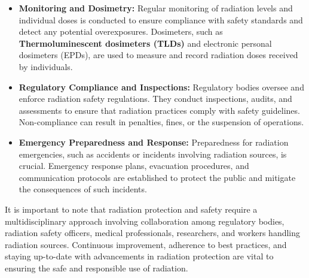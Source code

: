 \documentclass[../../Report.tex]{subfiles}
\begin{document}
\begin{itemize}
            \item \textbf{Monitoring and Dosimetry:} Regular monitoring of radiation levels and individual doses is conducted to ensure 
            compliance with safety standards and detect any potential overexposures. Dosimeters, such as \textbf{Thermoluminescent dosimeters (TLDs)} 
            and electronic personal dosimeters (EPDs), are used to measure and record radiation doses received by individuals.

            \item \textbf{Regulatory Compliance and Inspections:} Regulatory bodies oversee and enforce radiation safety regulations. 
            They conduct inspections, audits, and assessments to ensure that radiation practices comply with safety guidelines. 
            Non-compliance can result in penalties, fines, or the suspension of operations.

            \item \textbf{Emergency Preparedness and Response:} Preparedness for radiation emergencies, such as accidents or incidents involving 
            radiation sources, is crucial. Emergency response plans, evacuation procedures, and communication protocols are established to 
            protect the public and mitigate the consequences of such incidents.

        \end{itemize}
        It is important to note that radiation protection and safety require a multidisciplinary approach involving collaboration among 
        regulatory bodies, radiation safety officers, medical professionals, researchers, and workers handling radiation sources. 
        Continuous improvement, adherence to best practices, and staying up-to-date with advancements in radiation protection are vital to 
        ensuring the safe and responsible use of radiation.
\end{document}
